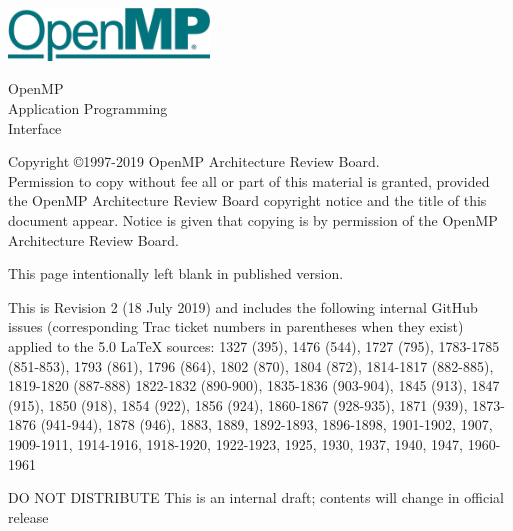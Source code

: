 
  \begin{titlepage}
    \begin{flushleft}
     \hspace{-6em} \includegraphics[width=0.4\textwidth]{openmp-logo.png}
    \end{flushleft}

    \begin{adjustwidth}{-0.75in}{0in}
    \begin{center}
      \Huge
      \textsf{OpenMP\\Application Programming\\Interface}

      \vspace{0.5in}\textsf{    }\vspace{-0.7in}
      \normalsize

      \vspace{1.0in}

      \textbf{\ompversion{}}
    \end{center}
    \end{adjustwidth}

    \vspace{3.0in}

\begin{adjustwidth}{0pt}{1em}\setlength{\parskip}{0.25\baselineskip}%
Copyright \copyright 1997-2019 OpenMP Architecture Review Board.\\
Permission to copy without fee all or part of this material is granted,
provided the OpenMP Architecture Review Board copyright notice and
the title of this document appear. Notice is given that copying is by
permission of the OpenMP Architecture Review Board.\end{adjustwidth}

  \end{titlepage}


\clearpage
\thispagestyle{empty}
\phantom{a}
This page intentionally left blank in published version.

This is Revision 2 (18 July 2019) and includes the following internal 
GitHub issues (corresponding Trac ticket numbers in parentheses when
they exist) applied to the 5.0 LaTeX sources: 1327 (395), 1476 (544), 
1727 (795), 1783-1785 (851-853), 1793 (861), 1796 (864), 1802 (870), 
1804 (872), 1814-1817 (882-885), 1819-1820 (887-888) 1822-1832 (890-900), 
1835-1836 (903-904), 1845 (913), 1847 (915), 1850 (918), 
1854 (922), 1856 (924), 1860-1867 (928-935), 1871 (939), 
1873-1876 (941-944), 1878 (946), 1883, 1889, 1892-1893, 1896-1898, 
1901-1902, 1907, 1909-1911, 1914-1916, 1918-1920, 1922-1923, 1925, 1930, 
1937, 1940, 1947, 1960-1961

DO NOT DISTRIBUTE
This is an internal draft; contents will change in official release

\vfill

